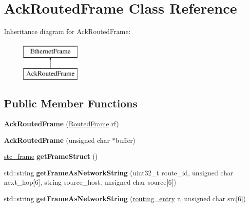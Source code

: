 \hypertarget{classAckRoutedFrame}{\section{Ack\-Routed\-Frame Class Reference}
\label{classAckRoutedFrame}
}
Inheritance diagram for Ack\-Routed\-Frame\-:\begin{figure}[H]
\begin{center}
\leavevmode
\includegraphics[height=2.000000cm]{classAckRoutedFrame}
\end{center}
\end{figure}
\subsection*{Public Member Functions}
\begin{DoxyCompactItemize}
\item 
\hypertarget{classAckRoutedFrame_ae1a29aa32b72d22f118148dd7bd519a8}{{\bfseries Ack\-Routed\-Frame} (\hyperlink{classRoutedFrame}{Routed\-Frame} rf)}\label{classAckRoutedFrame_ae1a29aa32b72d22f118148dd7bd519a8}

\item 
\hypertarget{classAckRoutedFrame_a4bd70e8a50d8332a8a6e0444950556a0}{{\bfseries Ack\-Routed\-Frame} (unsigned char $\ast$buffer)}\label{classAckRoutedFrame_a4bd70e8a50d8332a8a6e0444950556a0}

\item 
\hypertarget{classAckRoutedFrame_a900e8f5878a7e433e1fcff23408ca156}{\hyperlink{structstc__frame}{stc\-\_\-frame} {\bfseries get\-Frame\-Struct} ()}\label{classAckRoutedFrame_a900e8f5878a7e433e1fcff23408ca156}

\item 
\hypertarget{classAckRoutedFrame_a23f197ccf7ca36f02f0b662d357b8202}{std\-::string {\bfseries get\-Frame\-As\-Network\-String} (uint32\-\_\-t route\-\_\-id, unsigned char next\-\_\-hop\mbox{[}6\mbox{]}, string source\-\_\-host, unsigned char source\mbox{[}6\mbox{]})}\label{classAckRoutedFrame_a23f197ccf7ca36f02f0b662d357b8202}

\item 
\hypertarget{classAckRoutedFrame_a4d22b4cff6ab2697bceca35335a4e4d5}{std\-::string {\bfseries get\-Frame\-As\-Network\-String} (\hyperlink{structrouting__entry}{routing\-\_\-entry} r, unsigned char src\mbox{[}6\mbox{]})}\label{classAckRoutedFrame_a4d22b4cff6ab2697bceca35335a4e4d5}

\end{DoxyCompactItemize}
